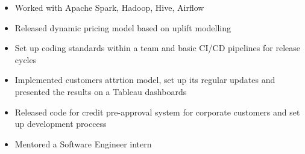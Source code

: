 \begin{itemize}
    \item Worked with Apache Spark, Hadoop, Hive, Airflow
    \item Released dynamic pricing model based on uplift modelling
    \item Set up coding standards within a team and basic CI/CD pipelines for release cycles
    \item Implemented customers attrtion model, set up its regular updates and presented the results on a Tableau dashboards
    \item Released code for credit pre-approval system for corporate customers and set up development proccess
    \item Mentored a Software Engineer intern
\end{itemize}
